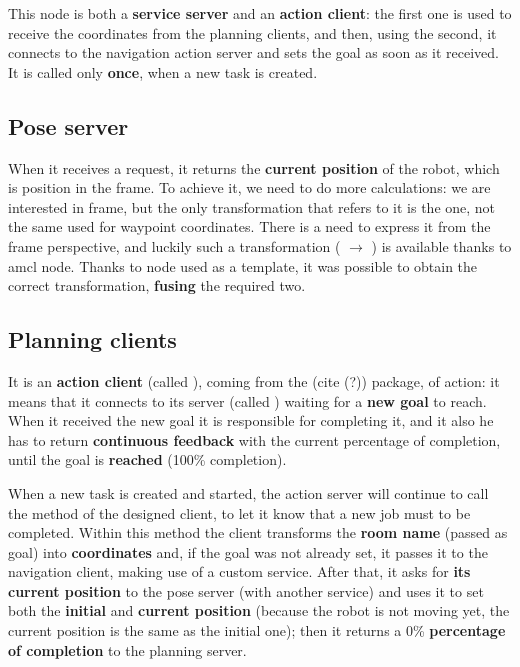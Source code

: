 This node is both a \textbf{service server} and an \textbf{action client}: the first one is used to receive the coordinates from the planning clients, and then, using the second, it connects to the navigation action server and sets the goal as soon as it received. It is called only \textbf{once}, when a new task is created.

\subsection{Pose server}
\label{sub:pose}

When it receives a request, it returns the \textbf{current position} of the robot, which is  position in the  frame. To achieve it, we need to do more calculations: we are interested in  frame, but the only transformation that refers to it is the  one, not the same used for waypoint coordinates. There is a need to express it from the  frame perspective, and luckily such a transformation ( $\rightarrow$ ) is available thanks to \acrshort{amcl} node. 
Thanks to  node\cite{tfexample} used as a template, it was possible to obtain the correct transformation, \textbf{fusing} the required two.

\subsection{Planning clients}

It is an \textbf{action client} (called ), coming from the  (cite (?)) package, of  action: it means that it connects to its server (called ) waiting for a \textbf{new goal} to reach. When it received the new goal it is responsible for completing it, and it also he has to return \textbf{continuous feedback} with the current percentage of completion, until the goal is \textbf{reached} (100\% completion).

When a new task is created and started, the action server will continue to call the  method of the designed client, to let it know that a new job must to be completed.
Within this method the client transforms the \textbf{room name} (passed as goal) into \textbf{coordinates} and, if the goal was not already set, it passes it to the navigation client, making use of a custom service. After that, it asks for \textbf{its current position} to the pose server (with another service) and uses it to set both the \textbf{initial} and \textbf{current position} (because the robot is not moving yet, the current position is the same as the initial one); then it returns a  0\% \textbf{percentage of completion} to the planning server.

